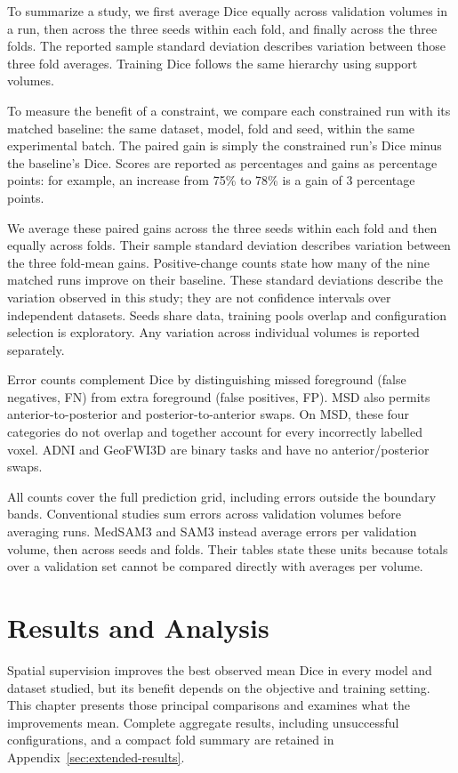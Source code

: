 \documentclass[12pt,a4paper]{article}
\begin{document}
To summarize a study, we first average Dice equally across validation
volumes in a run, then across the three seeds within each fold, and
finally across the three folds. The reported sample standard deviation
describes variation between those three fold averages. Training Dice
follows the same hierarchy using support volumes.

To measure the benefit of a constraint, we compare each constrained
run with its matched baseline: the same dataset, model, fold and seed,
within the same experimental batch. The paired gain is simply the
constrained run's Dice minus the baseline's Dice. Scores are reported
as percentages and gains as percentage points: for example, an increase
from 75\% to 78\% is a gain of 3 percentage points.

We average these paired gains across the three seeds within each fold
and then equally across folds. Their sample standard deviation describes
variation between the three fold-mean gains. Positive-change counts
state how many of the nine matched runs improve on their baseline.
These standard deviations describe the variation observed in this
study; they are not confidence intervals over independent datasets.
Seeds share data, training pools overlap and configuration selection
is exploratory. Any variation across individual volumes is reported
separately.

Error counts complement Dice by distinguishing missed foreground
(false negatives, FN) from extra foreground (false positives, FP).
MSD also permits anterior-to-posterior and posterior-to-anterior swaps.
On MSD, these four categories do not overlap and together account for
every incorrectly labelled voxel. ADNI and GeoFWI3D are binary tasks
and have no anterior/posterior swaps.

All counts cover the full prediction grid, including errors outside
the boundary bands. Conventional studies sum errors across validation
volumes before averaging runs. MedSAM3 and SAM3 instead average errors
per validation volume, then across seeds and folds. Their tables state
these units because totals over a validation set cannot be compared
directly with averages per volume.

\clearpage

\section{Results and Analysis}
\label{sec:results}

Spatial supervision improves the best observed mean Dice in every model
and dataset studied, but its benefit depends on the objective and training
setting. This chapter presents those principal comparisons and examines
what the improvements mean. Complete aggregate results, including unsuccessful configurations,
and a compact fold summary are retained in Appendix~\ref{sec:extended-results}.
\end{document}
